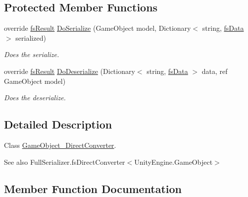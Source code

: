 \subsection*{Protected Member Functions}
\begin{DoxyCompactItemize}
\item 
override \hyperlink{struct_full_serializer_1_1fs_result}{fs\+Result} \hyperlink{class_full_serializer_1_1_internal_1_1_direct_converters_1_1_game_object___direct_converter_a01655c6b3c484d192362db3a30c27a73}{Do\+Serialize} (Game\+Object model, Dictionary$<$ string, \hyperlink{class_full_serializer_1_1fs_data}{fs\+Data} $>$ serialized)
\begin{DoxyCompactList}\small\item\em Does the serialize. \end{DoxyCompactList}\item 
override \hyperlink{struct_full_serializer_1_1fs_result}{fs\+Result} \hyperlink{class_full_serializer_1_1_internal_1_1_direct_converters_1_1_game_object___direct_converter_a93134c0f0b5c7d7cdc2449541f031bf3}{Do\+Deserialize} (Dictionary$<$ string, \hyperlink{class_full_serializer_1_1fs_data}{fs\+Data} $>$ data, ref Game\+Object model)
\begin{DoxyCompactList}\small\item\em Does the deserialize. \end{DoxyCompactList}\end{DoxyCompactItemize}


\subsection{Detailed Description}
Class \hyperlink{class_full_serializer_1_1_internal_1_1_direct_converters_1_1_game_object___direct_converter}{Game\+Object\+\_\+\+Direct\+Converter}. 

\begin{DoxySeeAlso}{See also}
Full\+Serializer.\+fs\+Direct\+Converter$<$\+Unity\+Engine.\+Game\+Object$>$


\end{DoxySeeAlso}


\subsection{Member Function Documentation}
\mbox{\label{class_full_serializer_1_1_internal_1_1_direct_converters_1_1_game_object___direct_converter_a0466ce2803d3ffa8034c849c523d20b7}} 
